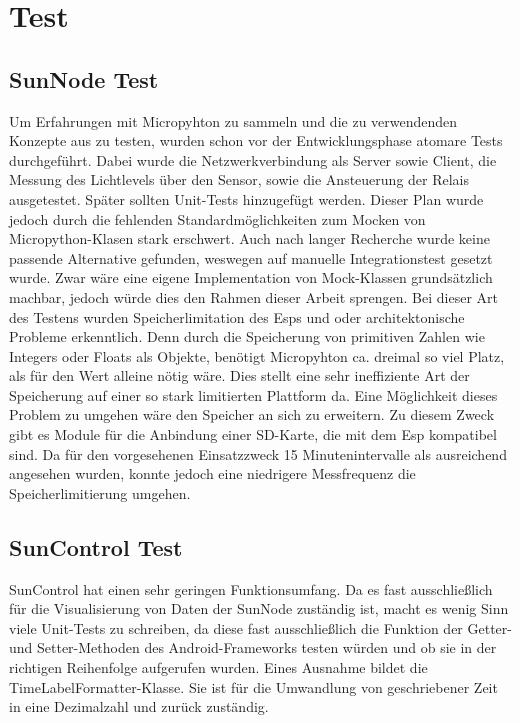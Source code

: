 \chapter{Test}

\section{SunNode Test}
Um Erfahrungen mit Micropyhton zu sammeln und die zu verwendenden Konzepte aus zu testen, wurden schon vor der Entwicklungsphase atomare Tests durchgeführt. Dabei wurde die Netzwerkverbindung als Server sowie Client, die Messung des Lichtlevels über den Sensor, sowie die Ansteuerung der Relais ausgetestet. Später sollten Unit-Tests hinzugefügt werden. Dieser Plan wurde jedoch durch die fehlenden Standardmöglichkeiten zum Mocken von Micropython-Klasen stark erschwert. Auch nach langer Recherche wurde keine passende Alternative gefunden, weswegen auf manuelle Integrationstest gesetzt wurde. Zwar wäre eine eigene Implementation von Mock-Klassen grundsätzlich machbar, jedoch würde dies den Rahmen dieser Arbeit sprengen.
Bei dieser Art des Testens wurden  Speicherlimitation des Esps und oder architektonische Probleme erkenntlich. Denn durch die Speicherung von primitiven Zahlen wie Integers oder Floats als Objekte, benötigt Micropyhton ca. dreimal so viel Platz, als für den Wert alleine nötig wäre. Dies stellt eine sehr ineffiziente Art der Speicherung auf einer so stark limitierten Plattform da. Eine Möglichkeit dieses Problem zu umgehen wäre den Speicher an sich zu erweitern. Zu diesem Zweck gibt es Module für die Anbindung einer SD-Karte, die mit dem Esp kompatibel sind. Da für den vorgesehenen Einsatzzweck 15 Minutenintervalle als ausreichend angesehen wurden, konnte jedoch eine niedrigere Messfrequenz die Speicherlimitierung umgehen.

\section{SunControl Test}
SunControl hat einen sehr geringen Funktionsumfang. Da es fast ausschließlich für die Visualisierung von Daten der SunNode zuständig ist, macht es wenig Sinn viele Unit-Tests zu schreiben, da diese fast ausschließlich die Funktion der Getter- und Setter-Methoden des Android-Frameworks testen würden und ob sie in der richtigen Reihenfolge aufgerufen wurden. Eines Ausnahme bildet die TimeLabelFormatter-Klasse. Sie ist für die Umwandlung von geschriebener Zeit in eine Dezimalzahl und zurück zuständig.